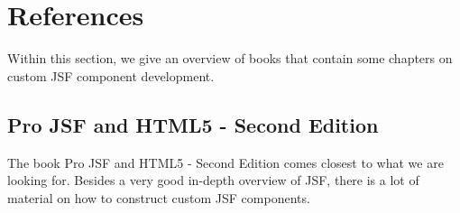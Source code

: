 %

\chapter*{References}
Within this section, we give an overview of books that contain some chapters on custom JSF component development.

\section*{Pro JSF and HTML5 - Second Edition}
The book Pro JSF and HTML5 - Second Edition \cite{wadia2014pro} comes closest to what we are looking for.
Besides a very good in-depth overview of JSF, there is a lot of material on how to construct custom JSF components.

